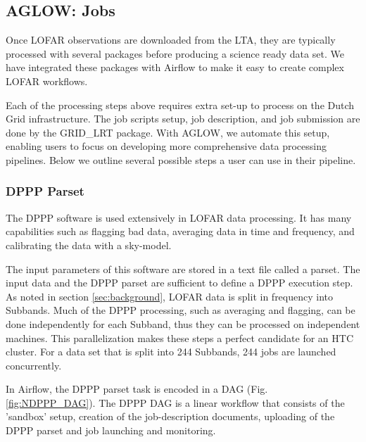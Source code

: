 \subsection{AGLOW: Jobs}

Once LOFAR observations are downloaded from the LTA, they are typically processed with several packages before producing a science ready data set. We have integrated these packages with Airflow to make it easy to create complex LOFAR workflows. 

Each of the processing steps above requires extra set-up to process on the Dutch Grid infrastructure. The job scripts setup, job description, and job submission are done by the GRID\_LRT package\cite{mechev}. With AGLOW, we automate this setup, enabling users to focus on developing more comprehensive data processing pipelines. Below we outline several possible steps a user can use in their pipeline. 

\subsubsection{DPPP Parset}
The DPPP software is used extensively in LOFAR data processing. It has many capabilities such as flagging bad data, averaging data in time and frequency, and calibrating the data with a sky-model. 

The input parameters of this software are stored in a text file called a parset. The input data and the DPPP parset are sufficient to define a DPPP execution step. As noted in section \ref{sec:background}, LOFAR data is split in frequency into Subbands. Much of the DPPP processing, such as averaging and flagging, can be done independently for each Subband, thus they can be processed on independent machines. This parallelization makes these steps a perfect candidate for an HTC cluster. For a data set that is split into 244 Subbands, 244 jobs are launched concurrently. 

In Airflow, the DPPP parset task is encoded in a DAG (Fig. \ref{fig:NDPPP_DAG}). The DPPP DAG is a linear workflow that consists of the 'sandbox' setup, creation of the job-description documents, uploading of the DPPP parset and job launching and monitoring.


